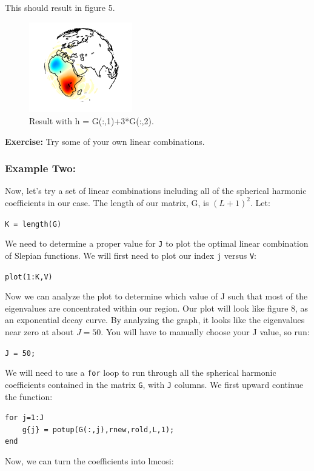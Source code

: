 \documentclass[11pt]{article}
\begin{document}
This should result in figure 5.

\begin{figure}
  \centering
  \includegraphics[width=0.4\textwidth]{figures/lincomb1.png}
  \caption{Result with h = G(:,1)+3*G(:,2).}
\label{lincomb1}
\end{figure}

\textbf{Exercise:} Try some of your own linear combinations.

\subsubsection{Example Two:}
Now, let's try a set of linear combinations including all of the spherical harmonic coefficients in our case.  The length of our matrix, G, is $(L+1)^2$.  Let:

\verb|K = length(G)|

We need to determine a proper value for \verb+J+ to plot the optimal linear combination of Slepian functions.  We will first need to plot our index \verb+j+ versus \verb+V+:

\verb|plot(1:K,V)|

Now we can analyze the plot to determine which value of J such that most of the eigenvalues are concentrated within our region.  Our plot will look like figure 8, as an exponential decay curve.  By analyzing the graph, it looks like the eigenvalues near zero at about $J=50$.  You will have to manually choose your J value, so run:

\verb+J = 50;+

We will need to use a \verb+for+ loop to run through all the spherical harmonic coefficients contained in the matrix \verb+G+, with \verb+J+ columns.  We first upward continue the function:

\verb+for j=1:J+\\
\verb+    g{j} = potup(G(:,j),rnew,rold,L,1);+\\
\verb+end+

Now, we can turn the coefficients into lmcosi:
\end{document}
